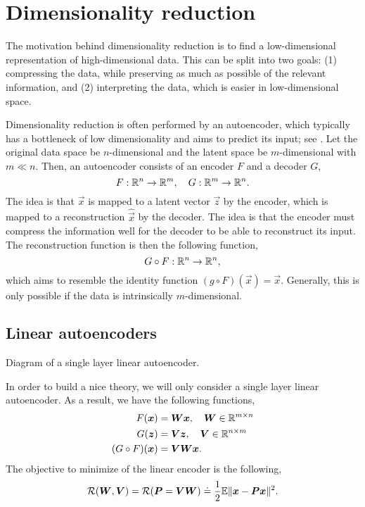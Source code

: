 \section{Dimensionality reduction}

The motivation behind dimensionality reduction is to find a low-dimensional representation of
high-dimensional data. This can be split into two goals: (1) compressing the
data, while preserving as much as possible of the relevant information, and (2) interpreting the
data, which is easier in low-dimensional space.

Dimensionality reduction is often performed by an autoencoder, which typically has a bottleneck of
low dimensionality and aims to predict its input; see . Let the original
data space be $n$-dimensional and the latent space be $m$-dimensional with $m \ll n$. Then, an
autoencoder consists of an encoder $F$ and a decoder $G$, \[
    F: \mathbb{R}^n \to \mathbb{R}^m, \quad G: \mathbb{R}^m \to \mathbb{R}^n.
\]
The idea is that $\vec{x}$ is mapped to a latent vector $\vec{z}$ by the encoder, which is mapped
to a reconstruction $\hat{\vec{x}}$ by the decoder. The idea is that the encoder must compress the
information well for the decoder to be able to reconstruct its input. The reconstruction function
is then the following function, \[
    G \circ F: \mathbb{R}^n \to \mathbb{R}^n,
\]
which aims to resemble the identity function $(g \circ F)(\vec{x}) = \vec{x}$. Generally, this is
only possible if the data is intrinsically $m$-dimensional.

\subsection{Linear autoencoders}

\begin{marginfigure}[-8cm]
    \centering
    \caption{Diagram of a single layer linear autoencoder.}
    \label{fig:auto-encoder}
\end{marginfigure}

In order to build a nice theory, we will only consider a single layer linear
autoencoder. As a result, we have the following functions,
\begin{align*}
    F(\bm{x})           & = \bm{W}\bm{x}, \quad \bm{W} \in \mathbb{R}^{m\times n}  \\
    G(\bm{z})           & = \bm{V} \bm{z}, \quad \bm{V} \in \mathbb{R}^{n\times m} \\
    (G \circ F)(\bm{x}) & = \bm{V} \bm{W} \bm{x}.
\end{align*}
The objective to minimize of the linear encoder is the following, \[
    \mathcal{R}(\bm{W},\bm{V}) = \mathcal{R}(\bm{P} = \bm{V}\bm{W}) \doteq \frac{1}{2} \mathbb{E} \| \bm{x}-\bm{P}\bm{x} \|^2.
\]

